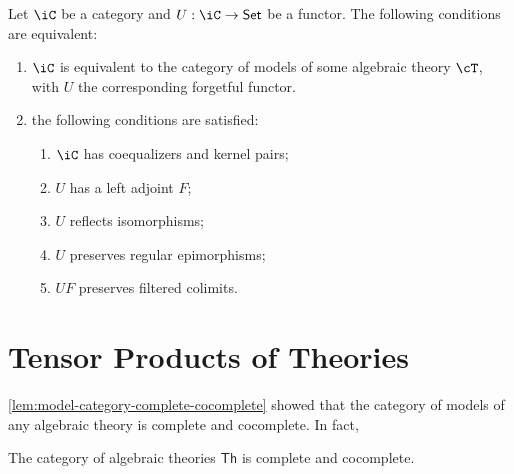 \documentclass{amsart}
\begin{document}
\begin{thm}
  Let $\iC$ be a category and $U : \iC \to \mathsf{Set}$ be a functor.
  The following conditions are equivalent:
  \begin{enumerate}
  \item $\iC$ is equivalent to the category of models of some algebraic theory $\cT$, with $U$ the corresponding forgetful functor.
  \item the following conditions are satisfied:
    \begin{enumerate}
    \item $\iC$ has coequalizers and kernel pairs;
    \item $U$ has a left adjoint $F$;
    \item $U$ reflects isomorphisms;
    \item $U$ preserves regular epimorphisms;
    \item $UF$ preserves filtered colimits.
    \end{enumerate}
  \end{enumerate}
\end{thm}

\section{Tensor Products of Theories}
\label{sec:tensor-products-of-theories}

\cref{lem:model-category-complete-cocomplete} showed that the category of models of any algebraic theory is complete and cocomplete.
In fact,

\begin{lem}
  The category of algebraic theories $\mathsf{Th}$ is complete and cocomplete.
\end{lem}




\end{document}
